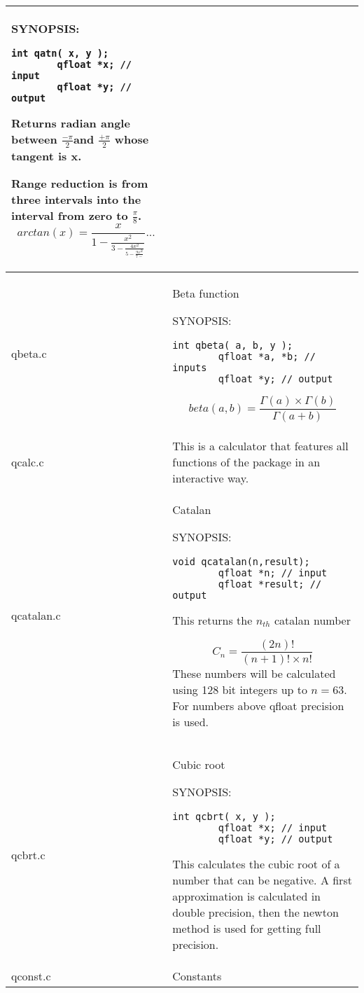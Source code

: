 \documentclass[10pt,a4paper,x11names]{memoir} %
\newcommand{\TOC}[1] {\addcontentsline{toc}{section}{#1} #1 \par}
\begin{document}
\begin{longtable}{|p{1.5cm}|p{11.5cm}|}
	{\footnotesize SYNOPSIS:}\vspace{-0.2cm}\index{qatn}
	\begin{lstlisting}[numbers=none]
		int qatn( x, y );
		qfloat *x; // input
		qfloat *y; // output
	\end{lstlisting}\vspace{-0.2cm}
	Returns radian angle between $\frac{-\pi}{2}$and $\frac{+\pi}{2}$ whose tangent is x.
	
	Range reduction is from three intervals into the interval from zero to $\frac{\pi}{8}$.
	$$arctan(x)=\frac{x}{1 - \frac{x^2}{3 - \frac{4x^2}{5 - \frac{9x^2}{7-}}}} ... $$
	
	\\\hline
	qbeta.c &\TOC{Beta function}
	{\footnotesize SYNOPSIS:}\vspace{-0.2cm}\index{qbeta}
	\begin{lstlisting}[numbers=none]
		int qbeta( a, b, y );
		qfloat *a, *b; // inputs
		qfloat *y; // output
	\end{lstlisting}\vspace{-0.2cm}
	
	$$ beta(a,b) = \frac{\Gamma (a) \times \Gamma (b)}{\Gamma (a+b)}$$
	\\\hline
	qcalc.c& \index{qcalc }This is a calculator that features all functions of the package in an interactive way.\\\hline
	qcatalan.c& \TOC{Catalan}
	{\footnotesize SYNOPSIS:}\vspace{-0.2cm}\index{qcatalan}
	\begin{lstlisting}[numbers=none]
		void qcatalan(n,result);
		qfloat *n; // input
		qfloat *result; // output
	\end{lstlisting}\vspace{-0.2cm}
	This returns the $n_{th}$ catalan number
	
	$$C_n=\frac{(2n)!}{(n+1)!\times n!}$$ These  numbers will be calculated using 128 bit integers up to $n=63$. For numbers above qfloat precision is used.
	\\\hline
	qcbrt.c& \TOC{Cubic root}
	{\footnotesize SYNOPSIS:}\vspace{-0.2cm}\index{qcbrt}
	\begin{lstlisting}[numbers=none]
		int qcbrt( x, y );
		qfloat *x; // input
		qfloat *y; // output
	\end{lstlisting}\vspace{-0.2cm}
	This calculates the cubic root of a number that can be negative. A first approximation is calculated in double precision, then  the newton method is used for getting full precision.
	\\\hline 
	qconst.c& \TOC{Constants}
	

\end{longtable}
\end{document}
